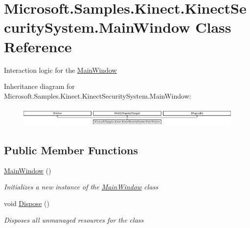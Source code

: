 \hypertarget{class_microsoft_1_1_samples_1_1_kinect_1_1_kinect_security_system_1_1_main_window}{}\section{Microsoft.\+Samples.\+Kinect.\+Kinect\+Security\+System.\+Main\+Window Class Reference}
\label{class_microsoft_1_1_samples_1_1_kinect_1_1_kinect_security_system_1_1_main_window}


Interaction logic for the \hyperlink{class_microsoft_1_1_samples_1_1_kinect_1_1_kinect_security_system_1_1_main_window}{Main\+Window}  


Inheritance diagram for Microsoft.\+Samples.\+Kinect.\+Kinect\+Security\+System.\+Main\+Window\+:\begin{figure}[H]
\begin{center}
\leavevmode
\includegraphics[height=1.022831cm]{class_microsoft_1_1_samples_1_1_kinect_1_1_kinect_security_system_1_1_main_window}
\end{center}
\end{figure}
\subsection*{Public Member Functions}
\begin{DoxyCompactItemize}
\item 
\hyperlink{class_microsoft_1_1_samples_1_1_kinect_1_1_kinect_security_system_1_1_main_window_a4ed9f24967289a072cf580d3d4cb19ba}{Main\+Window} ()
\begin{DoxyCompactList}\small\item\em Initializes a new instance of the \hyperlink{class_microsoft_1_1_samples_1_1_kinect_1_1_kinect_security_system_1_1_main_window}{Main\+Window} class \end{DoxyCompactList}\item 
void \hyperlink{class_microsoft_1_1_samples_1_1_kinect_1_1_kinect_security_system_1_1_main_window_a1b863ab898e2358e99993c0c30678e63}{Dispose} ()
\begin{DoxyCompactList}\small\item\em Disposes all unmanaged resources for the class \end{DoxyCompactList}\end{DoxyCompactItemize}
